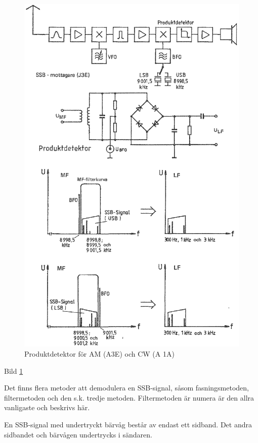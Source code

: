 \begin{figure}
\includegraphics[width=\textwidth]{images/cropped_pdfs/bild_2_3-56.pdf}
\caption{Produktdetektor för AM (A3E) och CW (A 1A)}
\label{fig:BildII3-56}
\end{figure}

Bild \ref{fig:BildII3-56}

Det finns flera metoder att demodulera en SSB-signal, såsom
fasningsmetoden, filtermetoden och den s.k. tredje
metoden. Filtermetoden är numera är den allra vanligaste och beskrivs
här.

En SSB-signal med undertryckt bärvåg består av endast ett sidband. Det
andra sidbandet och bärvågen undertrycks i sändaren.

